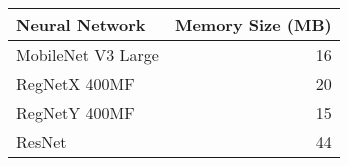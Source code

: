 \begin{tabular}{lr}
\toprule
Neural Network & Memory Size (MB) \\
\midrule
MobileNet V3 Large & 16 \\
RegNetX 400MF & 20 \\
RegNetY 400MF & 15 \\
ResNet & 44 \\
\bottomrule
\end{tabular}

